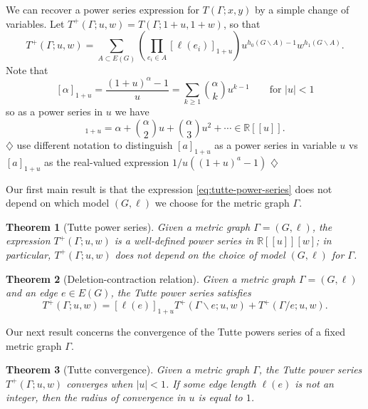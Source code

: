 \documentclass{amsart}
\newtheorem{thm}{Theorem}
\theoremstyle{definition}
\newcommand{\RR}{\mathbb{R}}
\newcommand{\harry}[1]{{\color{red} \sf $\diamondsuit$  {#1} $\diamondsuit$ }}
\newcommand{\note}[1]{\harry{#1}}
\begin{document}
We can recover a power series expression for $T(\Gamma; x,y)$ by a simple change of variables.
Let
$T^+(\Gamma; u,w) = T(\Gamma; 1 + u, 1 + w) $,
so that
\begin{equation}
\label{eq:tutte-power-series}
T^+(\Gamma; u,w) = \sum_{A \subset E(G)} \left( \prod_{e_i \in A} [\ell(e_i)]_{1+u} \right)
u^{h_0(G\backslash A) - 1}w^{h_1(G\backslash A)} .
\end{equation}
Note that
\[ [\alpha]_{1+u} = \frac{(1+u)^\alpha - 1}{u}
= \sum_{k \geq 1} \binom{\alpha}{k}u^{k-1} 
\qquad \text{for } |u|<1
\]
so as a power series in $u$ we have 
\begin{equation}
[\alpha]_{1+u} = \alpha + \binom{\alpha}{2} u + \binom{\alpha}{3} u^2 + \cdots
\in \RR[[u]] .
\end{equation}
\note{use different notation to distinguish $[a]_{1+u}$ as a power series in variable $u$ 
vs $[a]_{1+u}$ as the real-valued expression $1/u((1+u)^a-1)$}

Our first main result is that the expression \eqref{eq:tutte-power-series} does not depend on which  model $(G,\ell)$ we choose for the metric graph $\Gamma$.
\begin{thm}[Tutte power series]
\label{thm:tutte-series}
Given a metric graph $\Gamma = (G,\ell)$,
the expression $T^+(\Gamma; u,w)$
is a well-defined power series in
$\RR[[u]][w]$;
in particular,
$T^+(\Gamma; u,w)$ does not depend on the choice of model $(G,\ell)$ for $\Gamma$.
\end{thm}

\begin{thm}[Deletion-contraction relation]
\label{thm:deletion-contraction}
Given a metric graph $\Gamma = (G,\ell)$ and an edge $e \in E(G)$,
the Tutte power series satisfies
\begin{equation*}
T^+(\Gamma; u,w) = [\ell(e)]_{1+u} T^+(\Gamma \backslash e; u,w) + T^+(\Gamma / e; u,w).
\end{equation*}
\end{thm}

Our next result concerns the convergence of the Tutte powers series of a fixed metric graph $\Gamma$.
\begin{thm}[Tutte convergence]
\label{thm:tutte-convergence}
Given a metric graph $\Gamma$,
the Tutte power series $T^+(\Gamma;u,w)$ converges when $|u|<1$.
If some edge length $\ell(e)$ is not an integer,
then the radius of convergence in $u$ is equal to $1$.
\end{thm}
\end{document}
